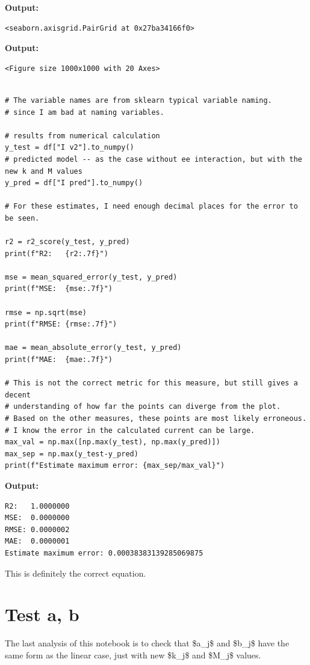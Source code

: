 \documentclass{article}
\begin{document}
\textbf{Output:}\begin{verbatim}
<seaborn.axisgrid.PairGrid at 0x27ba34166f0>
\end{verbatim}

\textbf{Output:}\begin{verbatim}
<Figure size 1000x1000 with 20 Axes>
\end{verbatim}

\begin{lstlisting}

# The variable names are from sklearn typical variable naming.
# since I am bad at naming variables.

# results from numerical calculation
y_test = df["I v2"].to_numpy()   
# predicted model -- as the case without ee interaction, but with the new k and M values
y_pred = df["I pred"].to_numpy() 

# For these estimates, I need enough decimal places for the error to be seen.

r2 = r2_score(y_test, y_pred)
print(f"R2:   {r2:.7f}")

mse = mean_squared_error(y_test, y_pred)
print(f"MSE:  {mse:.7f}")

rmse = np.sqrt(mse)
print(f"RMSE: {rmse:.7f}")

mae = mean_absolute_error(y_test, y_pred)
print(f"MAE:  {mae:.7f}")

# This is not the correct metric for this measure, but still gives a decent
# understanding of how far the points can diverge from the plot. 
# Based on the other measures, these points are most likely erroneous.
# I know the error in the calculated current can be large.
max_val = np.max([np.max(y_test), np.max(y_pred)])
max_sep = np.max(y_test-y_pred)
print(f"Estimate maximum error: {max_sep/max_val}")\end{lstlisting}

\textbf{Output:}\begin{verbatim}
R2:   1.0000000
MSE:  0.0000000
RMSE: 0.0000002
MAE:  0.0000001
Estimate maximum error: 0.00038383139285069875

\end{verbatim}

This is definitely the correct equation.

\section{Test a, b}

The last analysis of this notebook is to check that \$a\_j\$ and \$b\_j\$ have the same form as the linear case, just with new \$k\_j\$ and \$M\_j\$ values.
\end{document}
